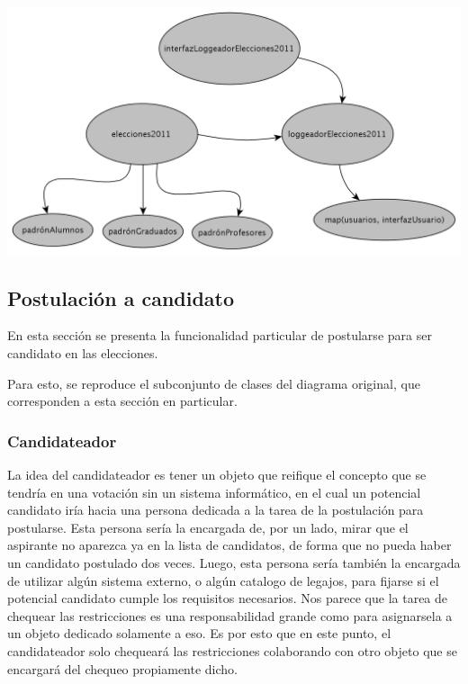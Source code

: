 \begin{center}
\includegraphics[scale=0.3]{diagramas/modeloDeObjetosLogging.png}
\end{center}





\subsection{Postulaci\'on a candidato}

En esta secci\'on se presenta la funcionalidad particular de postularse para ser candidato en las elecciones.


Para esto, se reproduce el subconjunto de clases del diagrama original, que corresponden a esta secci\'on en particular.




\subsubsection{Candidateador}

La idea del candidateador es tener un objeto que reifique el concepto que se tendr\'ia en una votaci\'on sin un sistema inform\'atico, en el cual un potencial candidato ir\'ia hacia una persona dedicada a la tarea de la postulaci\'on para postularse. Esta persona ser\'ia la encargada de, por un lado, mirar que el aspirante no aparezca ya en la lista de candidatos, de forma que no pueda haber un candidato postulado dos veces. Luego, esta persona ser\'ia tambi\'en la encargada de utilizar alg\'un sistema externo, o alg\'un catalogo de legajos, para fijarse si el potencial candidato cumple los requisitos necesarios. Nos parece que la tarea de chequear las restricciones es una responsabilidad grande como para asignarsela a un objeto dedicado solamente a eso. Es por esto que en este punto, el candidateador solo chequear\'a las restricciones colaborando con otro objeto que se encargar\'a del chequeo propiamente dicho.

